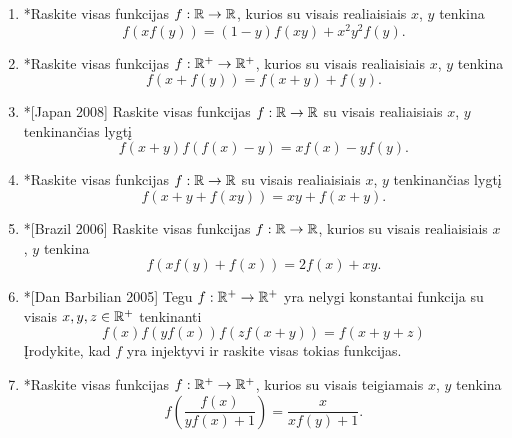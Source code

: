 \begin{enumerate}
  \item *Raskite visas funkcijas $f:\mathbb R\to\mathbb R$, kurios su visais realiaisiais
    $x$, $y$ tenkina $$f(xf(y))=(1-y)f(xy)+x^2y^2f(y).$$
  \item *Raskite visas funkcijas $f:\mathbb R^+\to\mathbb R^+$, kurios su visais
    realiaisiais $x$, $y$ tenkina $$f(x+f(y))=f(x+y)+f(y).$$
  \item *[Japan 2008] Raskite visas funkcijas $f: \mathbb R \to \mathbb R$ su visais
    realiaisiais $x$, $y$ tenkinančias lygtį
    $$f(x+y)f(f(x)-y)=xf(x)-yf(y).$$
  \item *Raskite visas funkcijas $f: \mathbb R \to \mathbb R$ su visais realiaisiais $x$,
    $y$ tenkinančias lygtį $$f(x+y+f(xy))=xy+f(x+y).$$
  \item *[Brazil 2006] Raskite visas funkcijas $f:\mathbb R\to\mathbb R$, kurios su
    visais realiaisiais $x$, $y$ tenkina $$f(xf(y)+f(x))=2f(x)+xy.$$
  \item *[Dan Barbilian 2005] Tegu $f:\mathbb R^+ \to \mathbb R^+$ yra nelygi konstantai
    funkcija su visais $x,y,z \in \mathbb R^+$ tenkinanti
    $$f(x)f(yf(x))f(zf(x+y))=f(x+y+z)$$ Įrodykite, kad $f$ yra injektyvi ir
    raskite visas tokias funkcijas.
  \item *Raskite visas funkcijas $f:\mathbb R^+\to\mathbb R^+$, kurios su visais
    teigiamais $x$, $y$ tenkina $$f\left(\frac{f(x)}{yf(x) + 1}\right) =
    \frac{x}{xf(y)+1}.$$
\end{enumerate}

